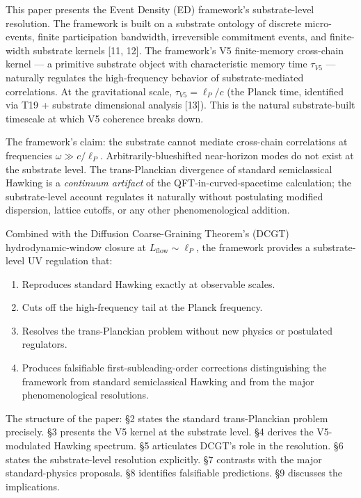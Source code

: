 \documentclass[11pt,a4paper]{article}
\begin{document}
This paper presents the Event Density (ED) framework's substrate-level resolution. The framework is built on a substrate ontology of discrete micro-events, finite participation bandwidth, irreversible commitment events, and finite-width substrate kernels [11, 12]. The framework's V5 finite-memory cross-chain kernel --- a primitive substrate object with characteristic memory time $\tau_{V5}$ --- naturally regulates the high-frequency behavior of substrate-mediated correlations. At the gravitational scale, $\tau_{V5} = \ell_P/c$ (the Planck time, identified via T19 + substrate dimensional analysis [13]). This is the natural substrate-built timescale at which V5 coherence breaks down.

The framework's claim: the substrate cannot mediate cross-chain correlations at frequencies $\omega \gg c/\ell_P$. Arbitrarily-blueshifted near-horizon modes do not exist at the substrate level. The trans-Planckian divergence of standard semiclassical Hawking is a \emph{continuum artifact} of the QFT-in-curved-spacetime calculation; the substrate-level account regulates it naturally without postulating modified dispersion, lattice cutoffs, or any other phenomenological addition.

Combined with the Diffusion Coarse-Graining Theorem's (DCGT) hydrodynamic-window closure at $L_\mathrm{flow} \sim \ell_P$, the framework provides a substrate-level UV regulation that:
\begin{enumerate}[noitemsep]
\item Reproduces standard Hawking exactly at observable scales.
\item Cuts off the high-frequency tail at the Planck frequency.
\item Resolves the trans-Planckian problem without new physics or postulated regulators.
\item Produces falsifiable first-subleading-order corrections distinguishing the framework from standard semiclassical Hawking and from the major phenomenological resolutions.
\end{enumerate}

The structure of the paper: \S2 states the standard trans-Planckian problem precisely. \S3 presents the V5 kernel at the substrate level. \S4 derives the V5-modulated Hawking spectrum. \S5 articulates DCGT's role in the resolution. \S6 states the substrate-level resolution explicitly. \S7 contrasts with the major standard-physics proposals. \S8 identifies falsifiable predictions. \S9 discusses the implications.
\end{document}
